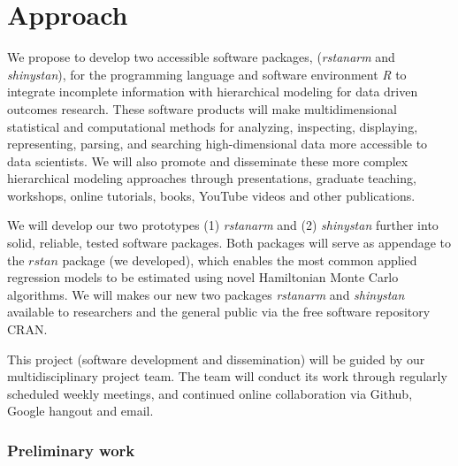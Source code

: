 \documentclass[11pt,notitlepage]{article}
\begin{document}
\part*{Approach}

We propose to develop two accessible software packages, (\textit{rstanarm} and \textit{shinystan}), for the programming language and software environment \textit{R} to integrate incomplete information with hierarchical modeling for data driven outcomes research. These software products will make multidimensional statistical and computational methods for analyzing, inspecting, displaying, representing, parsing, and searching high-dimensional data more accessible to data scientists. We will also promote and disseminate these more complex hierarchical modeling approaches through presentations, graduate teaching, workshops, online tutorials, books, YouTube videos and other publications.

We will develop our two prototypes (1) \textit{rstanarm} and (2) \textit{shinystan} further into solid, reliable, tested software packages. Both packages will serve as appendage to the $rstan$ package (we developed), which enables the most common applied regression models to be estimated using novel Hamiltonian Monte Carlo algorithms. We will makes our new two packages \textit{rstanarm} and \textit{shinystan} available to researchers and the general public via the free software repository CRAN. 

This project (software development and dissemination) will be guided by our multidisciplinary project team. The team will conduct its work through regularly scheduled weekly meetings, and continued online collaboration via Github, Google hangout and email. 



\section*{Preliminary work}
\end{document}
